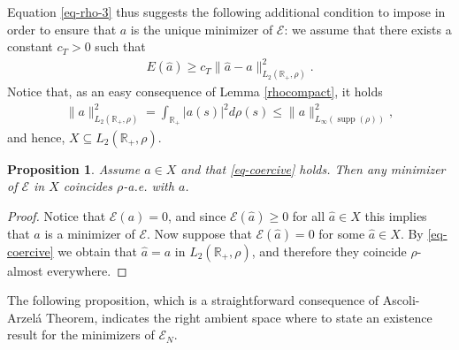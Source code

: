 \documentclass[A4paper,11pt]{article}
\newtheorem{proposition}[theorem]{Proposition}
\theoremstyle{definition}
\newcommand{\R}{\mathbb{R}}
\DeclareMathOperator{\supp}{supp}
\begin{document}
Equation \eqref{eq-rho-3} thus suggests the following additional condition to impose in order to ensure that $a$ is the unique minimizer of $\mathcal E$: we assume that there exists a constant $c_T>0$ such that
\begin{align}\label{eq-coercive}
	E(\widehat a)\geq c_T\|\widehat a-a\|^2_{L_2(\R_+,\rho)}.
\end{align}
Notice that, as an easy consequence of Lemma \ref{rhocompact}, it holds
\begin{align}\label{eq:inftyimplyl2}
\|a\|^2_{L_2(\R_+,\rho)} = \int_{\R_+} \bigl|a(s)\bigr|^2 d\rho(s) \leq \|a\|^2_{L_{\infty}(\supp(\rho))},
\end{align}
and hence, $X\subseteq L_2(\R_+,\rho)$. 

\begin{proposition}\label{uniquemin}
Assume $a \in X$ and that \eqref{eq-coercive} holds. Then any minimizer of $\mathcal E$ in $X$ coincides $\rho$-a.e. with $a$.
\end{proposition}
\begin{proof}
Notice that $\mathcal E(a)=0$, and since $\mathcal E(\widehat a)\geq 0$ for all $\widehat a\in X$ this implies that $a$ is a minimizer of $\mathcal E$. Now suppose that $ \mathcal E(\widehat a)=0$ for some $\widehat a\in X$. By \eqref{eq-coercive} we obtain that $\widehat a=a$ in $L_2(\R_+,\rho)$, and therefore they coincide $\rho$-almost everywhere. %
\end{proof}

The following proposition, which is a straightforward consequence of Ascoli-Arzel\'a Theorem, indicates the right ambient space where to state an existence result for the minimizers of $\mathcal E_N$.
\end{document}
